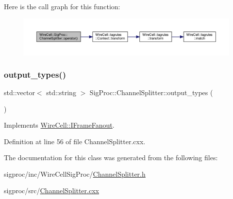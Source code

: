 Here is the call graph for this function\+:
\nopagebreak
\begin{figure}[H]
\begin{center}
\leavevmode
\includegraphics[width=350pt]{class_wire_cell_1_1_sig_proc_1_1_channel_splitter_a715114dbeb142744c3a140a902907ff0_cgraph}
\end{center}
\end{figure}
\mbox{\label{class_wire_cell_1_1_sig_proc_1_1_channel_splitter_aae5dd9627d127e38fd31d88a4b61b584}} 
\subsubsection{\texorpdfstring{output\+\_\+types()}{output\_types()}}
{\footnotesize\ttfamily std\+::vector$<$ std\+::string $>$ Sig\+Proc\+::\+Channel\+Splitter\+::output\+\_\+types (\begin{DoxyParamCaption}{ }\end{DoxyParamCaption})\hspace{0.3cm}{\ttfamily [virtual]}}



Implements \hyperlink{class_wire_cell_1_1_i_frame_fanout_aa54a33e4454b6d2cced872b903641d4a}{Wire\+Cell\+::\+I\+Frame\+Fanout}.



Definition at line 56 of file Channel\+Splitter.\+cxx.



The documentation for this class was generated from the following files\+:\begin{DoxyCompactItemize}
\item 
sigproc/inc/\+Wire\+Cell\+Sig\+Proc/\hyperlink{_channel_splitter_8h}{Channel\+Splitter.\+h}\item 
sigproc/src/\hyperlink{_channel_splitter_8cxx}{Channel\+Splitter.\+cxx}\end{DoxyCompactItemize}
